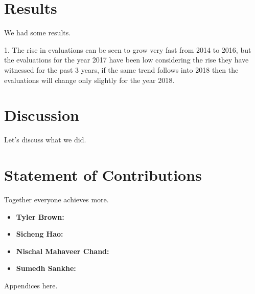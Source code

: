 \documentclass[12pt]{article}
\begin{document}
\section*{Results}

We had some results.


1. The rise in evaluations can be seen to grow very fast from 2014 to 2016, but the 
evaluations for the year 2017 have been low considering the rise they have witnessed 
for the past 3 years, if the same trend follows into 2018 then the evaluations will change 
only slightly for the year 2018.

\section*{Discussion}

Let's discuss what we did.

\section*{Statement of Contributions}

Together everyone achieves more.

\begin{itemize}
\item \textbf{Tyler Brown:}
\item \textbf{Sicheng Hao:}
\item \textbf{Nischal Mahaveer Chand:}
\item \textbf{Sumedh Sankhe:}
\end{itemize}

 


\begin{appendices}

Appendices here.

\end{appendices}
\end{document}
